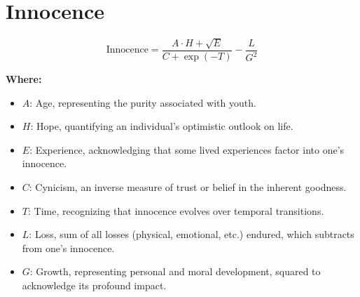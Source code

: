 \chapter{Innocence}

\begin{equation}
\text{Innocence} = \frac{\textit{A} \cdot \textit{H} + \sqrt{\textit{E}}}{\textit{C} + \exp{(-\textit{T})}} - \frac{\textit{L}}{\textit{G}^2}
\end{equation}

\textbf{Where:}

\begin{itemize}
    \item $A$: Age, representing the purity associated with youth.
    \item $H$: Hope, quantifying an individual’s optimistic outlook on life.
    \item $E$: Experience, acknowledging that some lived experiences factor into one’s innocence.
    \item $C$: Cynicism, an inverse measure of trust or belief in the inherent goodness.
    \item $T$: Time, recognizing that innocence evolves over temporal transitions.
    \item $L$: Loss, sum of all losses (physical, emotional, etc.) endured, which subtracts from one’s innocence.
    \item $G$: Growth, representing personal and moral development, squared to acknowledge its profound impact.
\end{itemize}